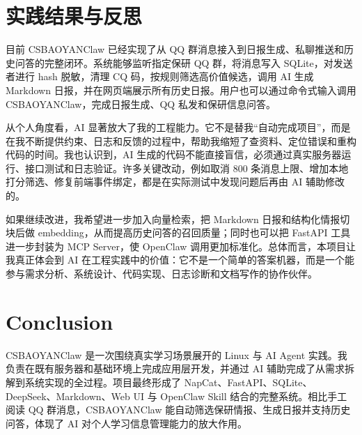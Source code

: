 \documentclass[conference]{IEEEtran}
\begin{document}
\section{实践结果与反思}

目前 CSBAOYANClaw 已经实现了从 QQ 群消息接入到日报生成、私聊推送和历史问答的完整闭环。系统能够监听指定保研 QQ 群，将消息写入 SQLite，对发送者进行 hash 脱敏，清理 CQ 码，按规则筛选高价值候选，调用 AI 生成 Markdown 日报，并在网页端展示所有历史日报。用户也可以通过命令式输入调用 CSBAOYANClaw，完成日报生成、QQ 私发和保研信息问答。

从个人角度看，AI 显著放大了我的工程能力。它不是替我“自动完成项目”，而是在我不断提供约束、日志和反馈的过程中，帮助我缩短了查资料、定位错误和重构代码的时间。我也认识到，AI 生成的代码不能直接盲信，必须通过真实服务器运行、接口测试和日志验证。许多关键改动，例如取消 800 条消息上限、增加本地打分筛选、修复前端事件绑定，都是在实际测试中发现问题后再由 AI 辅助修改的。

如果继续改进，我希望进一步加入向量检索，把 Markdown 日报和结构化情报切块后做 embedding，从而提高历史问答的召回质量；同时也可以把 FastAPI 工具进一步封装为 MCP Server，使 OpenClaw 调用更加标准化。总体而言，本项目让我真正体会到 AI 在工程实践中的价值：它不是一个简单的答案机器，而是一个能参与需求分析、系统设计、代码实现、日志诊断和文档写作的协作伙伴。

\section{Conclusion}

CSBAOYANClaw 是一次围绕真实学习场景展开的 Linux 与 AI Agent 实践。我负责在既有服务器和基础环境上完成应用层开发，并通过 AI 辅助完成了从需求拆解到系统实现的全过程。项目最终形成了 NapCat、FastAPI、SQLite、DeepSeek、Markdown、Web UI 与 OpenClaw Skill 结合的完整系统。相比手工阅读 QQ 群消息，CSBAOYANClaw 能自动筛选保研情报、生成日报并支持历史问答，体现了 AI 对个人学习信息管理能力的放大作用。
\end{document}
